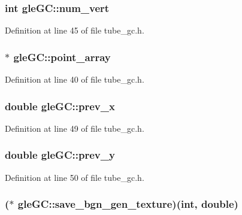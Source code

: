 \hypertarget{structgle_g_c_a4f2ed6f6f5fee00f9a0151c428dade80}{
\subsubsection[{num\-\_\-vert}]{\setlength{\rightskip}{0pt plus 5cm}int gle\-G\-C\-::num\-\_\-vert}}\label{structgle_g_c_a4f2ed6f6f5fee00f9a0151c428dade80}


Definition at line 45 of file tube\-\_\-gc.\-h.

\hypertarget{structgle_g_c_a6d84429068e9ee35f037659ad465a0bc}{
\subsubsection[{point\-\_\-array}]{$\ast$ gle\-G\-C\-::point\-\_\-array}}\label{structgle_g_c_a6d84429068e9ee35f037659ad465a0bc}


Definition at line 40 of file tube\-\_\-gc.\-h.

\hypertarget{structgle_g_c_a8af294b0236e6642f4c9306736989f07}{
\subsubsection[{prev\-\_\-x}]{\setlength{\rightskip}{0pt plus 5cm}double gle\-G\-C\-::prev\-\_\-x}}\label{structgle_g_c_a8af294b0236e6642f4c9306736989f07}


Definition at line 49 of file tube\-\_\-gc.\-h.

\hypertarget{structgle_g_c_a568f179a91bdac3ae81bb3c6ce7a9fbe}{
\subsubsection[{prev\-\_\-y}]{\setlength{\rightskip}{0pt plus 5cm}double gle\-G\-C\-::prev\-\_\-y}}\label{structgle_g_c_a568f179a91bdac3ae81bb3c6ce7a9fbe}


Definition at line 50 of file tube\-\_\-gc.\-h.

\hypertarget{structgle_g_c_aea8e942c9fe91ac4707c9a85123f625a}{
\subsubsection[{save\-\_\-bgn\-\_\-gen\-\_\-texture}]{($\ast$ gle\-G\-C\-::save\-\_\-bgn\-\_\-gen\-\_\-texture)(int, double)}}\label{structgle_g_c_aea8e942c9fe91ac4707c9a85123f625a}


